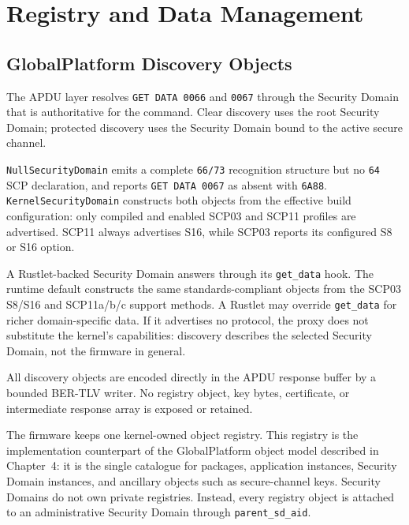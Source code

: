 \section{Registry and Data Management}
\label{sec:impl-registry}

\subsection{GlobalPlatform Discovery Objects}
\label{sec:impl-gp-discovery}

The APDU layer resolves \texttt{GET DATA 0066} and \texttt{0067} through the
Security Domain that is authoritative for the command. Clear discovery uses
the root Security Domain; protected discovery uses the Security Domain bound
to the active secure channel.

\texttt{NullSecurityDomain} emits a complete \texttt{66/73} recognition
structure but no \texttt{64} SCP declaration, and reports
\texttt{GET DATA 0067} as absent with \texttt{6A88}.
\texttt{KernelSecurityDomain} constructs both objects from the effective build
configuration: only compiled and enabled SCP03 and SCP11 profiles are
advertised. SCP11 always advertises S16, while SCP03 reports its configured S8
or S16 option.

A Rustlet-backed Security Domain answers through its \texttt{get\_data} hook.
The runtime default constructs the same standards-compliant objects from the
SCP03 S8/S16 and SCP11a/b/c support methods. A Rustlet may override
\texttt{get\_data} for richer domain-specific data. If it advertises no
protocol, the proxy does not substitute the kernel's capabilities: discovery
describes the selected Security Domain, not the firmware in general.

All discovery objects are encoded directly in the APDU response buffer by a
bounded BER-TLV writer. No registry object, key bytes, certificate, or
intermediate response array is exposed or retained.

The firmware keeps one kernel-owned object registry. This registry is the
implementation counterpart of the GlobalPlatform object model described in
Chapter~4: it is the single catalogue for packages, application instances,
Security Domain instances, and ancillary objects such as secure-channel keys.
Security Domains do not own private registries. Instead, every registry object
is attached to an administrative Security Domain through
\texttt{parent\_sd\_aid}.

